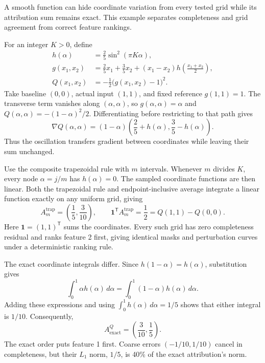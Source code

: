 \documentclass[12pt,letterpaper]{article}
\begin{document}
A smooth function can hide coordinate variation from every tested grid while its attribution sum remains exact. This example separates completeness and grid agreement from correct feature rankings.

For an integer $K>0$, define
\begin{align}
h(\alpha)&=\frac25\sin^2(\pi K\alpha),\\
g(x_1,x_2)&=\frac25x_1+\frac35x_2+
(x_1-x_2)h\!\left(\frac{x_1+x_2}{2}\right),\\
Q(x_1,x_2)&=-\frac12\bigl(g(x_1,x_2)-1\bigr)^2.
\end{align}
Take baseline $(0,0)$, actual input $(1,1)$, and fixed reference $g(1,1)=1$.
The transverse term vanishes along $(\alpha,\alpha)$, so
$g(\alpha,\alpha)=\alpha$ and $Q(\alpha,\alpha)=-(1-\alpha)^2/2$.
Differentiating before restricting to that path gives
\begin{equation}
\nabla Q(\alpha,\alpha)=(1-\alpha)
\left(\frac25+h(\alpha),\frac35-h(\alpha)\right).
\label{eq:aliasing-gradient}
\end{equation}
Thus the oscillation transfers gradient between coordinates while leaving their
sum unchanged.

Use the composite trapezoidal rule with $m$ intervals.
Whenever $m$ divides $K$, every node $\alpha=j/m$ has $h(\alpha)=0$.
The sampled coordinate functions are then linear. Both the trapezoidal rule and endpoint-inclusive average integrate a linear function exactly on any uniform grid, giving
\begin{equation}
A_m^{\mathrm{trap}}=\left(\frac15,\frac3{10}\right),\qquad
\mathbf{1}^{\mathsf T}A_m^{\mathrm{trap}}=\frac12=Q(1,1)-Q(0,0).
\label{eq:aliasing-coarse}
\end{equation}
Here $\mathbf{1}=(1,1)^{\mathsf T}$ sums the coordinates. Every such grid has zero
completeness residual and ranks feature 2 first, giving identical masks and
perturbation curves under a deterministic ranking rule.

The exact coordinate integrals differ. Since $h(1-\alpha)=h(\alpha)$,
substitution gives
\[
\int_0^1\alpha h(\alpha)\,d\alpha
=\int_0^1(1-\alpha)h(\alpha)\,d\alpha.
\]
Adding these expressions and using $\int_0^1 h(\alpha)\,d\alpha=1/5$
shows that either integral is $1/10$. Consequently,
\begin{equation}
A_{\mathrm{exact}}^Q=\left(\frac3{10},\frac15\right).
\label{eq:aliasing-exact}
\end{equation}
The exact order puts feature 1 first. Coarse errors $(-1/10,1/10)$ cancel in
completeness, but their $L_1$ norm, $1/5$, is 40\% of the exact attribution's norm.
\end{document}
